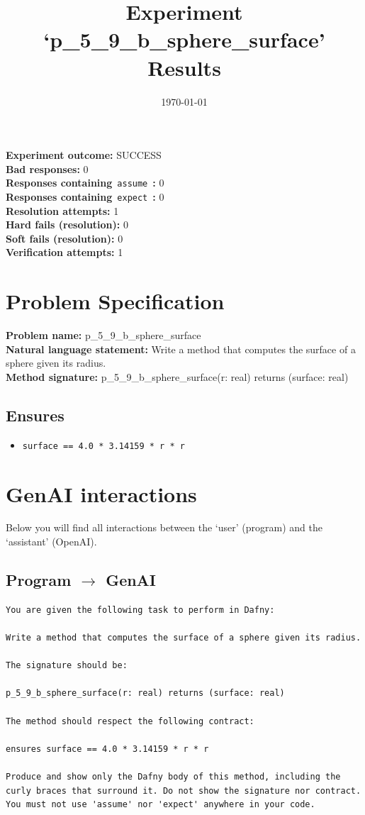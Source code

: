 \documentclass{article}
\begin{document}
\title{Experiment `p\_5\_9\_b\_sphere\_surface' Results}
\author{\today}
\date{}
\maketitle
\textbf{Experiment outcome: }SUCCESS
\\\textbf{Bad responses: }0
\\\textbf{Responses containing}~\texttt{assume}~\textbf{: }0
\\\textbf{Responses containing}~\texttt{expect}~\textbf{: }0
\\\textbf{Resolution attempts: }1
\\\textbf{Hard fails (resolution): }0
\\\textbf{Soft fails (resolution): }0
\\\textbf{Verification attempts: }1
\section*{Problem Specification}
\textbf{Problem name: }p\_5\_9\_b\_sphere\_surface
\\\textbf{Natural language statement: }Write a method that computes the surface of a sphere given its radius.
\\\textbf{Method signature: }p\_5\_9\_b\_sphere\_surface(r: real) returns (surface: real)
\subsection*{Ensures}
\begin{itemize}
\item \texttt{surface == 4.0 * 3.14159 * r * r}
\end{itemize}
\clearpage
\section*{GenAI interactions}
Below you will find all interactions between the `user' (program) and the `assistant' (OpenAI).
\subsection*{Program $\rightarrow$ GenAI}
\begin{lstlisting}
You are given the following task to perform in Dafny:

Write a method that computes the surface of a sphere given its radius.

The signature should be:

p_5_9_b_sphere_surface(r: real) returns (surface: real)

The method should respect the following contract:

ensures surface == 4.0 * 3.14159 * r * r

Produce and show only the Dafny body of this method, including the curly braces that surround it. Do not show the signature nor contract. You must not use 'assume' nor 'expect' anywhere in your code.
\end{lstlisting}
\end{document}
